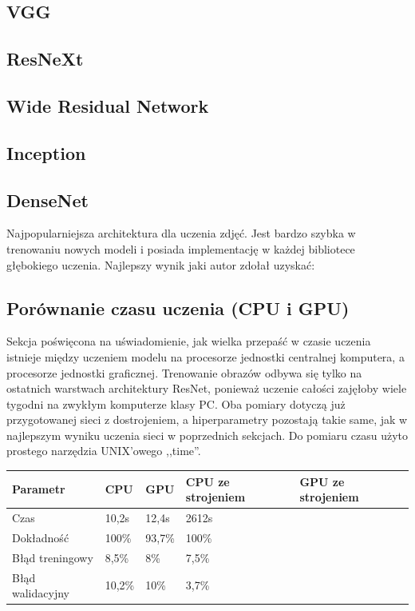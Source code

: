 \documentclass[12pt,a4paper,twoside,titlepage,openright]{book}
\begin{document}
\begin{itemize}
\subsection{VGG}

\subsection{ResNeXt}

\subsection{Wide Residual Network}

\subsection{Inception}

\subsection{DenseNet} %
Najpopularniejsza architektura dla uczenia zdjęć. Jest bardzo szybka w trenowaniu nowych modeli i posiada implementację w każdej bibliotece głębokiego uczenia. Najlepszy wynik jaki autor zdołał uzyskać:

\subsection{Porównanie czasu uczenia (CPU i GPU)}
Sekcja poświęcona na uświadomienie, jak wielka przepaść w czasie uczenia istnieje między uczeniem modelu na procesorze jednostki centralnej komputera, a procesorze jednostki graficznej. Trenowanie obrazów odbywa się tylko na ostatnich warstwach architektury ResNet, ponieważ uczenie całości zajęłoby wiele tygodni na zwykłym komputerze klasy PC.
Oba pomiary dotyczą już przygotowanej sieci z dostrojeniem, a hiperparametry pozostają takie same, jak w najlepszym wyniku uczenia sieci w poprzednich sekcjach. Do pomiaru czasu użyto prostego narzędzia UNIX'owego ,,time''.

\begin{center}
    \begin{tabular}{ | l | l | l | l | l |}
    \hline
    Parametr & CPU & GPU & CPU ze strojeniem & GPU ze strojeniem \\ \hline
    Czas & 10,2s & 12,4s & 2612s &  \\ \hline
    Dokładność & 100\% & 93,7\% & 100\% & \\ \hline
    Błąd treningowy & 8,5\% & 8\% & 7,5\% &  \\ \hline
    Błąd walidacyjny & 10,2\% & 10\% & 3,7\% &  \\ \hline
    \end{tabular}
\end{center}


\end{itemize}
\end{document}
